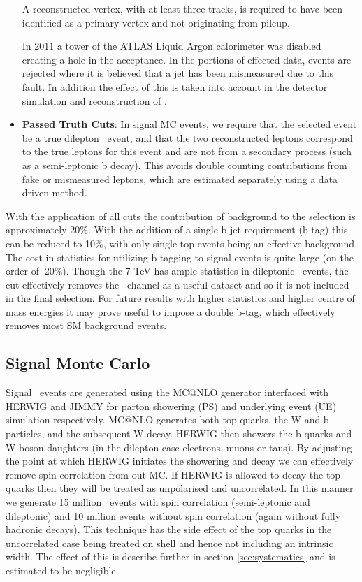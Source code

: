 \begin{itemize}
A reconstructed vertex, with at least three tracks, is required to have been identified as a primary vertex and not originating from pileup. 

In 2011 a tower of the ATLAS Liquid Argon calorimeter was disabled creating a hole in the acceptance. In the portions of effected data, events are rejected where it is believed that a jet has been mismeasured due to this fault. In addition the effect of this is taken into account in the detector simulation and reconstruction of \etmiss .

  \item \textbf{Passed Truth Cuts}: In signal MC events, we require that the selected event be a true dilepton \ttbar\ event, and that the two reconstructed leptons correspond to the true leptons for this event and are not from a secondary process (such as a semi-leptonic b decay). This avoids double counting contributions from fake or mismeasured leptons, which are estimated separately using a data driven method. 

\end{itemize}

With the application of all cuts the contribution of background to the selection is approximately 20\%. With the addition of a single b-jet requirement (b-tag) this can be reduced to 10\%, with only single top events being an effective background. The cost in statistics for utilizing b-tagging  to signal events is quite large (on the order of $~20$\%). Though the 7 TeV has ample statistics in dileptonic \ttbar\ events, the cut effectively removes the \ee\ channel as a useful dataset and so it is not included in the final selection. For future results with higher statistics and higher centre of mass energies it may prove useful to impose a double b-tag, which effectively removes most SM background events. 


\subsection{Signal Monte Carlo}
Signal \ttbar\ events are generated using the MC@NLO generator interfaced with HERWIG and JIMMY for parton showering (PS) and underlying event (UE) simulation respectively. MC@NLO generates both top quarks, the W and b particles, and the subsequent W decay. HERWIG then showers the b quarks and W boson daughters (in the dilepton case electrons, muons or taus). By adjusting the point at which HERWIG initiates the showering and decay we can effectively remove spin correlation from out MC. If HERWIG is allowed to decay the top quarks then they will be treated as unpolarised and uncorrelated. In this manner we generate 15 million \ttbar\ events with spin correlation (semi-leptonic and dileptonic) and 10 million events without spin correlation (again without fully hadronic decays). This technique has the side effect of the top quarks in the uncorrelated case being treated on shell and hence not including an intrinsic width. The effect of this is describe further in section \ref{sec:systematics} and is estimated to be negligible.

